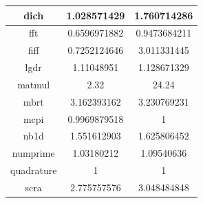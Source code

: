 \begin{table}[htbp]
\begin{tabular}{|c|c|c|}
dich                        & 1.028571429                                                                    & 1.760714286                                                                 \\ \hline
fft                         & 0.6596971882                                                                   & 0.9473684211                                                                \\ \hline
fiff                        & 0.7252124646                                                                   & 3.011331445                                                                 \\ \hline
lgdr                        & 1.11048951                                                                     & 1.128671329                                                                 \\ \hline
matmul                      & 2.32                                                                           & 24.24                                                                       \\ \hline
mbrt                        & 3.162393162                                                                    & 3.230769231                                                                 \\ \hline
mcpi                        & 0.9969879518                                                                   & 1                                                                           \\ \hline
nb1d                        & 1.551612903                                                                    & 1.625806452                                                                 \\ \hline
numprime                    & 1.03180212                                                                     & 1.09540636                                                                  \\ \hline
quadrature                  & 1                                                                              & 1                                                                           \\ \hline
scra                        & 2.775757576                                                                    & 3.048484848                                                                 \\ \hline

\end{tabular}
\end{table}
